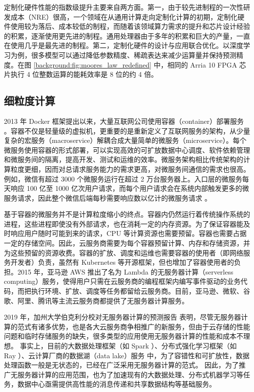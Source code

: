 定制化硬件性能的指数级提升主要来自两方面。第一，由于较先进制程的一次性研发成本（NRE）很高，一个领域在从通用计算走向定制化计算的初期，定制化硬件使用较为落后、成本较低的制程，而随着该领域算力需求的提升和芯片设计经验的积累，逐渐使用更先进的制程。通用处理器由于多年的积累和巨大的产量，一直在使用几乎是最先进的制程。第二，定制化硬件的设计与应用联合优化。以深度学习为例，很多模型可以通过降低参数精度、稀疏表达来减少运算量并保持预测精度。在图 \ref{background:fig:moores_law_redefined} 中，相同的 Arria 10 FPGA 芯片执行 4 位整数运算的能耗效率是 8 位的约 4 倍。

\subsection{细粒度计算}
\label{background:sec:datacenter-granular}

2013 年 Docker 框架提出以来，大量互联网公司使用容器（container）部署服务 \cite{bernstein2014containers}。容器不仅是轻量级的虚拟机，更重要的是重新定义了互联网服务的架构，从少量复杂的宏服务（macroservice）解耦合成大量简单的微服务（microservice）。每个微服务使用容器的形式部署，可以实现高效的可扩放数据中心调度、软件依赖管理和微服务间的隔离，提高开发、测试和运维的效率。微服务架构相比传统架构的计算粒度更细，因而对总请求服务能力的需求更高，对微服务间通信的需求也很高。
例如，微信有超过 3000 个微服务运行在超过 2 万台服务器上。入口层的微服务每天响应 100 亿至 1000 亿次用户请求，而每个用户请求会在系统内部触发更多的微服务请求，因此整个微信后端每秒需要响应数以亿计的微服务请求 \cite{zhou2018overload}。

基于容器的微服务并不是计算粒度缩小的终点。容器内仍然运行着传统操作系统的进程，这些进程即使没有外部请求，也在消耗一定的内存资源。为了保证容器能及时响应用户随时可能到来的请求，CPU 等计算资源也需要预留。容器也需要占据一定的存储空间。因此，云服务商需要为每个容器预留计算、内存和存储资源，并为这些预留的资源收费。容器的扩放、调度和运维也需要容器的使用者（即网络服务开发者）负责，虽然有 Kubernetes \cite{burns2016borg} 等开源框架，但也增加了容器使用者的负担。2015 年，亚马逊 AWS 推出了名为 Lambda 的无服务器计算（serverless computing）服务，使得用户只需在云服务商的编程框架内编写事件驱动的业务代码，而把执行环境、扩放、调度等任务都留给云服务商。目前，亚马逊、微软、谷歌、阿里、腾讯等主流云服务商都提供了无服务器计算服务。

2019 年，加州大学伯克利分校对无服务器计算的预测报告 \cite{jonas2019cloud} 表明，尽管无服务器计算的范式有诸多优势，也是各大云服务商争相推广的新服务，但由于云存储的性能问题和临时存储服务的缺失，很多类型的应用使用无服务器计算的性能和成本不理想。
事实上，目前的大数据处理框架（如 Spark \cite{zaharia2010spark}）、分布式强化学习框架（如 Ray \cite{moritz2018ray}）、云计算厂商的数据湖（data lake）服务 \cite{ramakrishnan2017azure} 中，为了容错性和可扩放性，数据处理函数一般是无状态的，已经在广泛采用无服务器计算的范式。
因此，为了推广无服务器计算的应用范围，也为了加速现有的大数据处理、分布式机器学习等任务，数据中心亟需提供高性能的消息传递和共享数据结构等基础服务。

